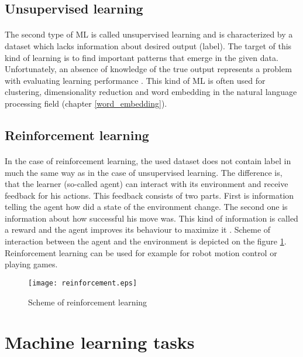 \subsection{Unsupervised learning}
\paragraph{}
The second type of ML is called unsupervised learning and is characterized by a dataset which lacks information about desired output (label). The target of this kind of learning is to find important patterns that emerge in the given data. Unfortunately, an absence of knowledge of the true output represents a problem with evaluating learning performance \cite{ml_probabilistic}. This kind of ML is often used for clustering, dimensionality reduction and word embedding in the natural language processing field (chapter \ref{word_embedding}).

\subsection{Reinforcement learning}
\paragraph{}
In the case of reinforcement learning, the used dataset does not contain label in much the same way as in the case of unsupervised learning. The difference is, that the learner (so-called agent) can interact with its environment and receive feedback for his actions. This feedback consists of two parts. First is information telling the agent how did a state of the environment change. The second one is information about how successful his move was. This kind of information is called a reward \cite{ml_foundations} and the agent improves its behaviour to maximize it \cite{python_ml_2nd}. Scheme of interaction between the agent and the environment is depicted on the figure \ref{reinforcement_scheme}. Reinforcement learning can be
used for example for robot motion control or playing games.

\begin{figure}[!h]
	\texttt{[image: reinforcement.eps]}
	\centering
	\caption{Scheme of reinforcement learning}
	\label{reinforcement_scheme}
\end{figure}

\section{Machine learning tasks}\label{ML_tasks_section}
